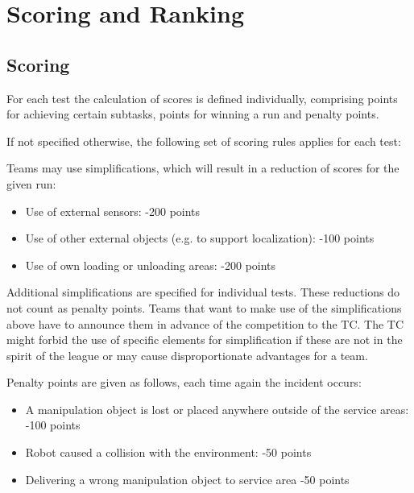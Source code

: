 

\newpage

\section{Scoring and Ranking} \label{sec:ScoringAndRanking}


\subsection{Scoring} \label{ssec:ScoringAndRanking}
For each test the calculation of scores is defined individually, comprising points for achieving certain subtasks, points for winning a run and penalty points.
\par
If not specified otherwise, the following set of scoring rules applies for each test:
\par
Teams may use simplifications, which will result in a reduction of scores for the given run:

\begin{itemize}
	\item Use of external sensors: \hfill -200 points
	\item Use of other external objects (e.g. to support localization): \hfill -100 points
	\item Use of own loading or unloading areas: \hfill -200 points
\end{itemize}

Additional simplifications are specified for individual tests. These reductions do not count as penalty points. Teams that want to make use of the simplifications above have to announce them in advance of the competition to the TC. The TC might forbid the use of specific elements for simplification if these are not in the spirit of the league or may cause disproportionate advantages for a team.
\par
Penalty points are given as follows, each time again the incident occurs:

\begin{itemize}
	\item A manipulation object is lost or placed anywhere outside of the service areas: \hfill -100 points
	\item Robot caused a collision with the environment: \hfill -50 points
	\item Delivering a wrong manipulation object to service area \hfill -50 points
\end{itemize}

